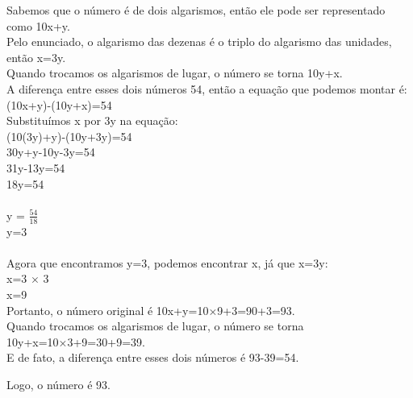 \documentclass[a4paper,14pt]{article}
\begin{document}
\begin{multicols}{2}
\begin{enumerate}
        Sabemos que o número é de dois algarismos, então ele pode ser representado como 10x+y.\\
        
        Pelo enunciado, o algarismo das dezenas é o triplo do algarismo das unidades, então x=3y.\\
        
        Quando trocamos os algarismos de lugar, o número se torna 10y+x.\\
        
        A diferença entre esses dois números 54, então a equação que podemos montar é: \\
        (10x+y)-(10y+x)=54\\
        
        Substituímos x por 3y na equação: \\
        (10(3y)+y)-(10y+3y)=54 \\
        30y+y-10y-3y=54 \\
        31y-13y=54 \\
        18y=54 \\\\
        y = $\frac{54}{18}$ \\
        y=3 \\ \\
        Agora que encontramos y=3, podemos encontrar x, já que x=3y: \\
        
        x=3 $\times$ 3 \\
        
        x=9 \\
        
        Portanto, o número original é 10x+y=10×9+3=90+3=93. \\
        
        Quando trocamos os algarismos de lugar, o número se torna 10y+x=10×3+9=30+9=39. \\
        
        E de fato, a diferença entre esses dois números é 93-39=54.
        
        Logo, o número é 93.
    
    \end{enumerate}        
    \end{multicols}    
\end{document}
